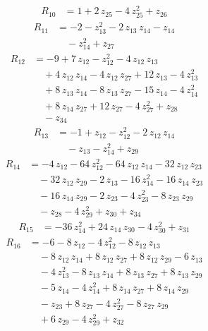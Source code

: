 \begin{equation*}\begin{aligned}
R_{10}&=1 +2\,z_{25} -4\,z_{25}^{2} +z_{26}
\end{aligned}\end{equation*}
\begin{equation*}\begin{aligned}
R_{11}&=-2 -z_{13}^{2} -2\,z_{13}\,z_{14} -z_{14} \\
&\quad -z_{14}^{2} +z_{27}
\end{aligned}\end{equation*}
\begin{equation*}\begin{aligned}
R_{12}&=-9 +7\,z_{12} -z_{12}^{2} -4\,z_{12}\,z_{13} \\
&\quad +4\,z_{12}\,z_{14} -4\,z_{12}\,z_{27} +12\,z_{13} -4\,z_{13}^{2} \\
&\quad +8\,z_{13}\,z_{14} -8\,z_{13}\,z_{27} -15\,z_{14} -4\,z_{14}^{2} \\
&\quad +8\,z_{14}\,z_{27} +12\,z_{27} -4\,z_{27}^{2} +z_{28} \\
&\quad -z_{34}
\end{aligned}\end{equation*}
\begin{equation*}\begin{aligned}
R_{13}&=-1 +z_{12} -z_{12}^{2} -2\,z_{12}\,z_{14} \\
&\quad -z_{13} -z_{14}^{2} +z_{29}
\end{aligned}\end{equation*}
\begin{equation*}\begin{aligned}
R_{14}&=-4\,z_{12} -64\,z_{12}^{2} -64\,z_{12}\,z_{14} -32\,z_{12}\,z_{23} \\
&\quad -32\,z_{12}\,z_{29} -2\,z_{13} -16\,z_{14}^{2} -16\,z_{14}\,z_{23} \\
&\quad -16\,z_{14}\,z_{29} -2\,z_{23} -4\,z_{23}^{2} -8\,z_{23}\,z_{29} \\
&\quad -z_{28} -4\,z_{29}^{2} +z_{30} +z_{34}
\end{aligned}\end{equation*}
\begin{equation*}\begin{aligned}
R_{15}&=-36\,z_{14}^{2} +24\,z_{14}\,z_{30} -4\,z_{30}^{2} +z_{31}
\end{aligned}\end{equation*}
\begin{equation*}\begin{aligned}
R_{16}&=-6 -8\,z_{12} -4\,z_{12}^{2} -8\,z_{12}\,z_{13} \\
&\quad -8\,z_{12}\,z_{14} +8\,z_{12}\,z_{27} +8\,z_{12}\,z_{29} -6\,z_{13} \\
&\quad -4\,z_{13}^{2} -8\,z_{13}\,z_{14} +8\,z_{13}\,z_{27} +8\,z_{13}\,z_{29} \\
&\quad -5\,z_{14} -4\,z_{14}^{2} +8\,z_{14}\,z_{27} +8\,z_{14}\,z_{29} \\
&\quad -z_{23} +8\,z_{27} -4\,z_{27}^{2} -8\,z_{27}\,z_{29} \\
&\quad +6\,z_{29} -4\,z_{29}^{2} +z_{32}
\end{aligned}\end{equation*}

